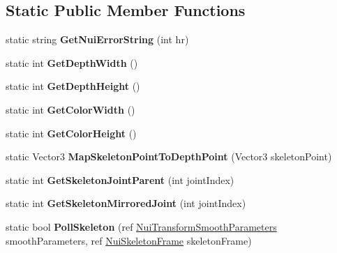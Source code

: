 \subsection*{Static Public Member Functions}
\begin{DoxyCompactItemize}
\item 
\mbox{\label{class_kinect_wrapper_a3cb502bd9f349d6ed93d318e27f96062}} 
static string {\bfseries Get\+Nui\+Error\+String} (int hr)
\item 
\mbox{\label{class_kinect_wrapper_afd77e6475589c7e610922ff3e0dc655c}} 
static int {\bfseries Get\+Depth\+Width} ()
\item 
\mbox{\label{class_kinect_wrapper_a205e1fe831c2ea3eba4b46a0d3fbae73}} 
static int {\bfseries Get\+Depth\+Height} ()
\item 
\mbox{\label{class_kinect_wrapper_a47574196fb217f80f0b4c348fc341758}} 
static int {\bfseries Get\+Color\+Width} ()
\item 
\mbox{\label{class_kinect_wrapper_a06b0c509ebf20b8528616234edd3d4f6}} 
static int {\bfseries Get\+Color\+Height} ()
\item 
\mbox{\label{class_kinect_wrapper_a68f55b015fa7916f593a4a4a18f9537e}} 
static Vector3 {\bfseries Map\+Skeleton\+Point\+To\+Depth\+Point} (Vector3 skeleton\+Point)
\item 
\mbox{\label{class_kinect_wrapper_a206dc55a20ec2bdaa093df0b41ee81ad}} 
static int {\bfseries Get\+Skeleton\+Joint\+Parent} (int joint\+Index)
\item 
\mbox{\label{class_kinect_wrapper_a2e121255ab87d3ba7c442635f48c313c}} 
static int {\bfseries Get\+Skeleton\+Mirrored\+Joint} (int joint\+Index)
\item 
\mbox{\label{class_kinect_wrapper_a013c4895027fa5c64eca7351d21f738c}} 
static bool {\bfseries Poll\+Skeleton} (ref \mbox{\hyperlink{struct_kinect_wrapper_1_1_nui_transform_smooth_parameters}{Nui\+Transform\+Smooth\+Parameters}} smooth\+Parameters, ref \mbox{\hyperlink{struct_kinect_wrapper_1_1_nui_skeleton_frame}{Nui\+Skeleton\+Frame}} skeleton\+Frame)

\end{DoxyCompactItemize}
